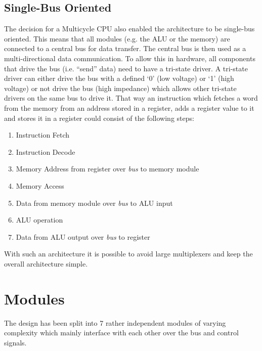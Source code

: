 \subsection{Single-Bus Oriented}
The decision for a Multicycle \gls{CPU} also enabled the architecture to be single-bus oriented.
This means that all modules (e.g. the \gls{ALU} or the memory) are connected to a central bus for data transfer.
The central bus is then used as a multi-directional data communication.
To allow this in hardware, all components that drive the bus (i.e. ``send'' data) need to have a tri-state driver.
A tri-state driver can either drive the bus with a defined `0' (low voltage) or `1' (high voltage) or not drive the bus (high impedance) which allows other tri-state drivers on the same bus to drive it.
That way an instruction which fetches a word from the memory from an address stored in a register, adds a register value to it and stores it in a register could consist of the following steps:
\begin{enumerate}
  \item Instruction Fetch
  \item Instruction Decode
  \item Memory Address from register over \emph{bus} to memory module
  \item Memory Access
  \item Data from memory module over \emph{bus} to \gls{ALU} input
  \item \gls{ALU} operation
  \item Data from \gls{ALU} output over \emph{bus} to register
\end{enumerate}
With such an architecture it is possible to avoid large multiplexers and keep the overall architecture simple.


\section{Modules}
The design has been split into 7 rather independent modules of varying complexity which mainly interface with each other over the bus and control signals.

